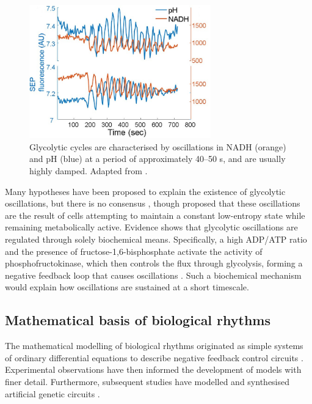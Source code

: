 \begin{figure}
  \centering
  \includegraphics[width=0.7\textwidth]{doddLiveCellImaging2017_3a_adapted}
  \caption[
    Glycolytic cycles
  ]{
    Glycolytic cycles are characterised by oscillations in NADH (orange) and pH (blue) at a period of approximately 40--50 s, and are usually highly damped.
    Adapted from \textcite{doddLiveCellImaging2017}.}
  \label{fig:intro-glycolytic-overview}
\end{figure}

Many hypotheses have been proposed to explain the existence of glycolytic oscillations, but there is no consensus \parencite{lloydSaccharomycesCerevisiaeOscillatory2019}, though \textcite{thokeConstantLowentropyProcess2018} proposed that these oscillations are the result of cells attempting to maintain a constant low-entropy state while remaining metabolically active.
Evidence shows that glycolytic oscillations are regulated through solely biochemical means.
Specifically, a high ADP/ATP ratio and the presence of fructose-1,6-bisphosphate activate the activity of phosphofructokinase, which then controls the flux through glycolysis, forming a negative feedback loop that causes oscillations \parencite{ghoshOscillationsGlycolyticIntermediates1964, higginsChemicalMechanismOscillation1964}.
Such a biochemical mechanism would explain how oscillations are sustained at a short timescale.

\subsection{Mathematical basis of biological rhythms}
\label{subsec:intro-biological_rhythms-theoretical_basis}

The mathematical modelling of biological rhythms originated as simple systems of ordinary differential equations to describe negative feedback control circuits \parencite{goodwinOscillatoryBehaviorEnzymatic1965, griffithMathematicsCellularControl1968}.
Experimental observations have then informed the development of models with finer detail.
Furthermore, subsequent studies have modelled and synthesised artificial genetic circuits \parencite{elowitzSyntheticOscillatoryNetwork2000}.

